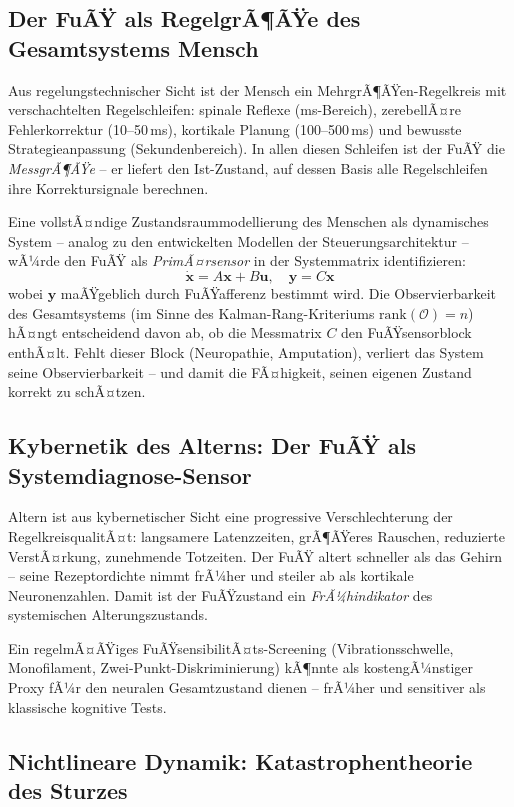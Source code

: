 ﻿\documentclass[12pt,a4paper]{report}
\theoremstyle{plain}
\theoremstyle{definition}
\theoremstyle{remark}
\begin{document}
\subsection{Der FuÃŸ als RegelgrÃ¶ÃŸe des Gesamtsystems Mensch}

Aus regelungstechnischer Sicht ist der Mensch ein
MehrgrÃ¶ÃŸen-Regelkreis mit verschachtelten Regelschleifen:
spinale Reflexe (ms-Bereich), zerebellÃ¤re Fehlerkorrektur
(10--50\,ms), kortikale Planung (100--500\,ms) und
bewusste Strategieanpassung (Sekundenbereich). In allen diesen
Schleifen ist der FuÃŸ die \emph{MessgrÃ¶ÃŸe} -- er liefert den
Ist-Zustand, auf dessen Basis alle Regelschleifen ihre
Korrektursignale berechnen.

Eine vollstÃ¤ndige Zustandsraummodellierung des Menschen als
dynamisches System -- analog zu den entwickelten Modellen der Steuerungsarchitektur -- wÃ¼rde den
FuÃŸ als \emph{PrimÃ¤rsensor} in der Systemmatrix identifizieren:
\[
  \dot{\mathbf{x}} = A\mathbf{x} + B\mathbf{u}, \quad \mathbf{y} = C\mathbf{x}
\]
wobei $\mathbf{y}$ maÃŸgeblich durch FuÃŸafferenz bestimmt wird.
Die Observierbarkeit des Gesamtsystems (im Sinne des
Kalman-Rang-Kriteriums $\text{rank}(\mathcal{O}) = n$) hÃ¤ngt
entscheidend davon ab, ob die Messmatrix $C$ den FuÃŸsensorblock
enthÃ¤lt. Fehlt dieser Block (Neuropathie, Amputation), verliert
das System seine Observierbarkeit -- und damit die FÃ¤higkeit,
seinen eigenen Zustand korrekt zu schÃ¤tzen.

\subsection{Kybernetik des Alterns: Der FuÃŸ als Systemdiagnose-Sensor}

Altern ist aus kybernetischer Sicht eine progressive
Verschlechterung der RegelkreisqualitÃ¤t: langsamere Latenzzeiten,
grÃ¶ÃŸeres Rauschen, reduzierte VerstÃ¤rkung, zunehmende
Totzeiten. Der FuÃŸ altert schneller als das Gehirn -- seine
Rezeptordichte nimmt frÃ¼her und steiler ab als kortikale
Neuronenzahlen. Damit ist der FuÃŸzustand ein
\emph{FrÃ¼hindikator} des systemischen Alterungszustands.

Ein regelmÃ¤ÃŸiges FuÃŸsensibilitÃ¤ts-Screening (Vibrationsschwelle,
Monofilament, Zwei-Punkt-Diskriminierung) kÃ¶nnte als kostengÃ¼nstiger
Proxy fÃ¼r den neuralen Gesamtzustand dienen -- frÃ¼her und
sensitiver als klassische kognitive Tests.

\subsection{Nichtlineare Dynamik: Katastrophentheorie des Sturzes}
\end{document}

